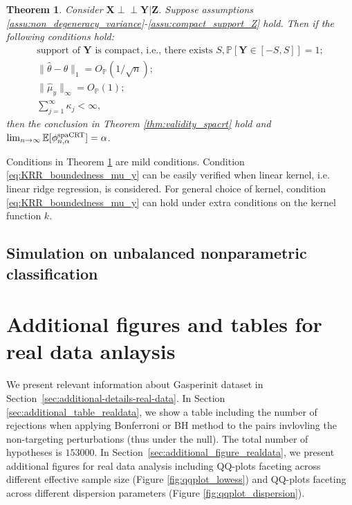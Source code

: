 \documentclass[12pt]{article}
\newtheorem{theorem}{Theorem}
\theoremstyle{definition}
\newcommand{\indep}{\perp \!\!\! \perp}
\def\P{\mathbb{P}}
\def\P{\mathbb{P}}
\newcommand{\E}{\mathbb E}								%
\renewcommand{\P}{\mathbb{P}}							%
\newcommand{\prx}{\bm X}								%
\newcommand{\prz}{\bm Z}								%
\newcommand{\pry}{{\bm Y}}								%
\newcommand{\spacrt}{\textnormal{spaCRT}}               %
\begin{document}
\begin{theorem}\label{thm:nonparametric_ml_spacrt}
  Consider $\prx\indep\pry|\prz$. Suppose assumptions \ref{assu:non_degeneracy_variance}-\ref{assu:compact_support_Z} hold. Then if the following conditions hold:
  \begin{align}
    \text{support of $\pry$ is compact, i.e., there exists }S, \P[\pry\in[-S,S]]=1;\label{eq:KRR_compact_support_Y}\\
    \|\widehat{\theta}-\theta\|_1=O_\P(1/\sqrt{n});\label{eq:KRR_mu_x_consistency}\\
    \|\widehat{\mu}_{y}\|_{\infty}=O_\P(1);\label{eq:KRR_boundedness_mu_y}\\
    \sum_{j=1}^{\infty}\kappa_j<\infty,\label{eq:KRR_kernel_function}
  \end{align}
  then the conclusion in Theorem \ref{thm:validity_spacrt} hold and $\lim_{n\rightarrow\infty}\E[\phi_{n,\alpha}^{\spacrt}]=\alpha$.
\end{theorem}

Conditions in Theorem \ref{thm:nonparametric_ml_spacrt} are mild conditions. Condition \eqref{eq:KRR_boundedness_mu_y} can be easily verified when linear kernel, i.e. linear ridge regression, is considered. For general choice of kernel, condition \eqref{eq:KRR_boundedness_mu_y} can hold under extra conditions on the kernel function $k$.


\subsection{Simulation on unbalanced nonparametric classification}\label{sec:simulation_nonparametric_RF_classification}



\newpage

\section{Additional figures and tables for real data anlaysis}

We present relevant information about Gasperinit dataset in Section~\ref{sec:additional-details-real-data}. In Section \ref{sec:additional_table_realdata}, we show a table including the number of rejections when applying Bonferroni or BH method to the pairs invlovling the non-targeting perturbations (thus under the null). The total number of hypotheses is $153000$. In Section~\ref{sec:additional_figure_realdata}, we present additional figures for real data analysis including QQ-plots faceting across different effective sample size (Figure \ref{fig:qqplot_lowess}) and QQ-plots faceting across different dispersion parameters (Figure \ref{fig:qqplot_dispersion}). 
\end{document}
